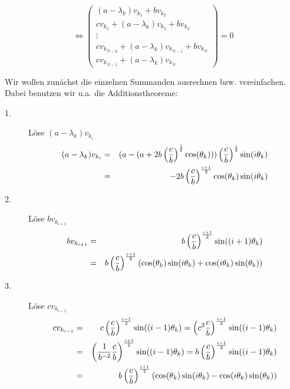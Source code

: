 \begin{equation}
\Longleftrightarrow
\begin{pmatrix}
(a - \lambda_{k}) v_{k_{1}} + b v_{k_{2}}\\
c v_{k_{1}} + (a - \lambda_{k}) v_{k_{2}} + b v_{k_{3}}\\
\vdots\\
c v_{k_{N-2}} + (a - \lambda_{k}) v_{k_{N-1}} + b v_{k_{N}}\\
c v_{k_{N-1}} + (a - \lambda_{k}) v_{k_{N}}
\end{pmatrix}
= 0
\end{equation}

Wir wollen zunächst die einzelnen Summanden ausrechnen bzw. vereinfachen. Dabei benutzen wir u.a. die Additionstheoreme:

\begin{description}
\item[1.] Löse $(a - \lambda_{k}) v_{k_{i}}$
\begin{eqnarray}
(a - \lambda_{k}) v_{k_{i}} &=& (a - (a + 2b\left(\frac{c}{b}\right)^{\frac{1}{2}} \cos(\theta_{k}))) \left(\frac{c}{b}\right)^{\frac{i}{2}} \sin(i \theta_{k})\notag \\
&=& -2b\left(\frac{c}{b}\right)^{\frac{i+1}{2}} \cos(\theta_{k})\sin(i \theta_{k}) \notag
\end{eqnarray}
\item[2.] Löse $b v_{k_{i+1}}$
\begin{eqnarray}
b v_{k_{i+1}} &=& b \left(\frac{c}{b}\right)^{\frac{i+1}{2}} \sin((i+1) \theta_{k})\notag \\
&=& b \left(\frac{c}{b}\right)^{\frac{i+1}{2}} (\cos(\theta_{k}) \sin(i \theta_{k}) + \cos(i \theta_{k}) \sin(\theta_{k})) \notag
\end{eqnarray}
\item[3.] Löse $c v_{k_{i-1}}$
\begin{eqnarray}
c v_{k_{i-1}} &=& c \left(\frac{c}{b}\right)^{\frac{i-1}{2}} \sin((i-1) \theta_{k}) = \left(c^{2}\frac{c}{b}\right)^{\frac{i-1}{2}} \sin((i-1) \theta_{k})\notag \\
&=& \left(\frac{1}{b^{-2}} \frac{c}{b}\right)^{\frac{i+1}{2}} \sin((i-1) \theta_{k}) = b \left(\frac{c}{b}\right)^{\frac{i+1}{2}} \sin((i-1) \theta_{k}) \notag \\
&=& b \left(\frac{c}{b}\right)^{\frac{i+1}{2}} (\cos(\theta_{k}) \sin(i \theta_{k}) - \cos(i \theta_{k}) \sin(\theta_{k})) \notag
\end{eqnarray}
\end{description}

